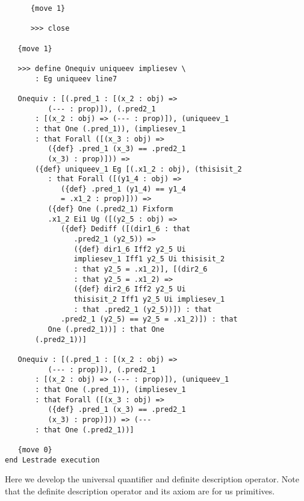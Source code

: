 \documentclass[12pt]{article}
\begin{document}
\begin{verbatim}
      {move 1}

      >>> close

   {move 1}

   >>> define Onequiv uniqueev impliesev \
       : Eg uniqueev line7

   Onequiv : [(.pred_1 : [(x_2 : obj) => 
          (--- : prop)]), (.pred2_1 
       : [(x_2 : obj) => (--- : prop)]), (uniqueev_1 
       : that One (.pred_1)), (impliesev_1 
       : that Forall ([(x_3 : obj) => 
          ({def} .pred_1 (x_3) == .pred2_1 
          (x_3) : prop)])) => 
       ({def} uniqueev_1 Eg [(.x1_2 : obj), (thisisit_2 
          : that Forall ([(y1_4 : obj) => 
             ({def} .pred_1 (y1_4) == y1_4 
             = .x1_2 : prop)])) => 
          ({def} One (.pred2_1) Fixform 
          .x1_2 Ei1 Ug ([(y2_5 : obj) => 
             ({def} Dediff ([(dir1_6 : that 
                .pred2_1 (y2_5)) => 
                ({def} dir1_6 Iff2 y2_5 Ui 
                impliesev_1 Iff1 y2_5 Ui thisisit_2 
                : that y2_5 = .x1_2)], [(dir2_6 
                : that y2_5 = .x1_2) => 
                ({def} dir2_6 Iff2 y2_5 Ui 
                thisisit_2 Iff1 y2_5 Ui impliesev_1 
                : that .pred2_1 (y2_5))]) : that 
             .pred2_1 (y2_5) == y2_5 = .x1_2)]) : that 
          One (.pred2_1))] : that One 
       (.pred2_1))]

   Onequiv : [(.pred_1 : [(x_2 : obj) => 
          (--- : prop)]), (.pred2_1 
       : [(x_2 : obj) => (--- : prop)]), (uniqueev_1 
       : that One (.pred_1)), (impliesev_1 
       : that Forall ([(x_3 : obj) => 
          ({def} .pred_1 (x_3) == .pred2_1 
          (x_3) : prop)])) => (--- 
       : that One (.pred2_1))]

   {move 0}
end Lestrade execution
\end{verbatim}

Here we develop the universal quantifier and definite description operator.  Note that the definite description operator and its axiom are for us primitives.
\end{document}
